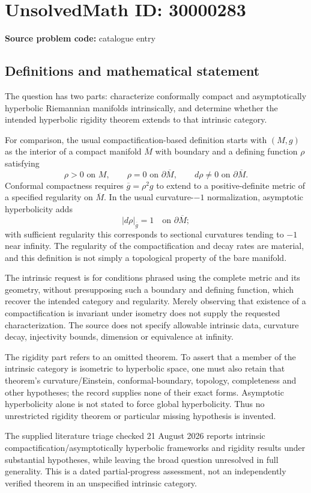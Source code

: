 \documentclass[11pt]{article}
\begin{document}
\section*{UnsolvedMath ID: 30000283}
\textbf{Source problem code:} catalogue entry
\subsection{Definitions and mathematical statement}
The question has two parts: characterize conformally compact and asymptotically hyperbolic Riemannian manifolds intrinsically, and determine whether the intended hyperbolic rigidity theorem extends to that intrinsic category.

For comparison, the usual compactification-based definition starts with $(M,g)$ as the interior of a compact manifold $\overline M$ with boundary and a defining function $\rho$ satisfying
\[
 \rho>0\text{ on }M,\qquad \rho=0\text{ on }\partial\overline M,
 \qquad d\rho\ne0\text{ on }\partial\overline M.
\]
Conformal compactness requires $\overline g=\rho^2g$ to extend to a positive-definite metric of a specified regularity on $\overline M$. In the usual curvature-$-1$ normalization, asymptotic hyperbolicity adds
\[
 |d\rho|_{\overline g}=1\quad\text{on }\partial\overline M;
\]
with sufficient regularity this corresponds to sectional curvatures tending to $-1$ near infinity. The regularity of the compactification and decay rates are material, and this definition is not simply a topological property of the bare manifold.

The intrinsic request is for conditions phrased using the complete metric and its geometry, without presupposing such a boundary and defining function, which recover the intended category and regularity. Merely observing that existence of a compactification is invariant under isometry does not supply the requested characterization. The source does not specify allowable intrinsic data, curvature decay, injectivity bounds, dimension or equivalence at infinity.

The rigidity part refers to an omitted theorem. To assert that a member of the intrinsic category is isometric to hyperbolic space, one must also retain that theorem's curvature/Einstein, conformal-boundary, topology, completeness and other hypotheses; the record supplies none of their exact forms. Asymptotic hyperbolicity alone is not stated to force global hyperbolicity. Thus no unrestricted rigidity theorem or particular missing hypothesis is invented.

The supplied literature triage checked 21 August 2026 reports intrinsic compactification/asymptotically hyperbolic frameworks and rigidity results under substantial hypotheses, while leaving the broad question unresolved in full generality. This is a dated partial-progress assessment, not an independently verified theorem in an unspecified intrinsic category.
\end{document}
